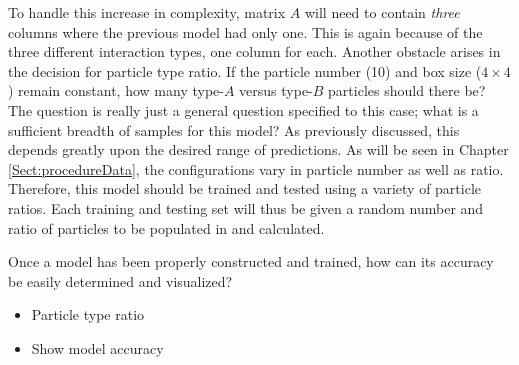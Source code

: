 \par To handle this increase in complexity, matrix $A$ will need to contain \textit{three} columns where the previous model had only one. This is again because of the three different interaction types, one column for each. Another obstacle arises in the decision for particle type ratio. If the particle number (10) and box size ($4\times4$) remain constant, how many type-$A$ versus type-$B$ particles should there be? The question is really just a general question specified to this case; what is a sufficient breadth of samples for this model? As previously discussed, this depends greatly upon the desired range of predictions. As will be seen in Chapter \ref{Sect:procedureData}, the configurations vary in particle number as well as ratio. Therefore, this model should be trained and tested using a variety of particle ratios. Each training and testing set will thus be given a random number and ratio of particles to be populated in and calculated. 
\par Once a model has been properly constructed and trained, how can its accuracy be easily determined and visualized?


\begin{itemize}
\item Particle type ratio
\item Show model accuracy
\end{itemize}



